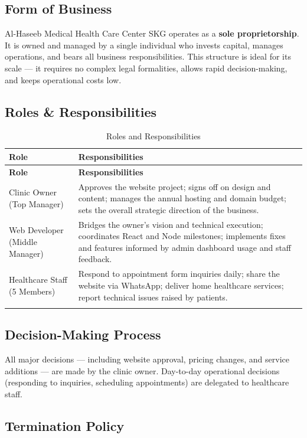 \documentclass[12pt, a4paper]{article}
\begin{document}
\subsection{Form of Business}

Al-Haseeb Medical Health Care Center SKG operates as a \textbf{sole proprietorship}. It is owned and managed by a single individual who invests capital, manages operations, and bears all business responsibilities. This structure is ideal for its scale — it requires no complex legal formalities, allows rapid decision-making, and keeps operational costs low.

\subsection{Roles \& Responsibilities}

\begin{longtable}{@{} L{3.5cm} L{10.9cm} @{}}
\toprule
\textbf{Role} & \textbf{Responsibilities} \\
\midrule
\endfirsthead
\toprule
\textbf{Role} & \textbf{Responsibilities} \\
\midrule
\endhead
Clinic Owner (Top Manager) &
Approves the website project; signs off on design and content; manages the annual hosting and domain budget; sets the overall strategic direction of the business. \\[6pt]
Web Developer (Middle Manager) &
Bridges the owner's vision and technical execution; coordinates React and Node milestones; implements fixes and features informed by admin dashboard usage and staff feedback. \\[6pt]
Healthcare Staff (5 Members) &
Respond to appointment form inquiries daily; share the website via WhatsApp; deliver home healthcare services; report technical issues raised by patients. \\
\bottomrule
\caption{Roles and Responsibilities}
\end{longtable}

\subsection{Decision-Making Process}

All major decisions — including website approval, pricing changes, and service additions — are made by the clinic owner. Day-to-day operational decisions (responding to inquiries, scheduling appointments) are delegated to healthcare staff.

\subsection{Termination Policy}
\end{document}
